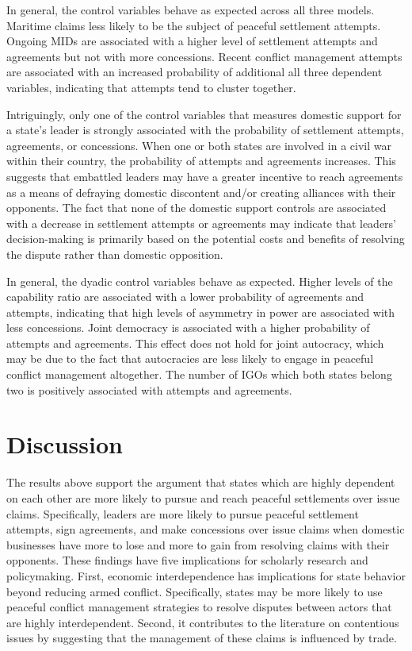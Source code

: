 In general, the control variables behave as expected across all three models. Maritime claims less likely to be the subject of peaceful settlement attempts. Ongoing MIDs are associated with a higher level of settlement attempts and agreements but not with more concessions. Recent conflict management attempts are associated with an increased probability of additional all three dependent variables, indicating that attempts tend to cluster together. 

Intriguingly, only one of the control variables that measures domestic support for a state’s leader is strongly associated with the probability of settlement attempts, agreements, or concessions. When one or both states are involved in a civil war within their country, the probability of attempts and agreements increases. This suggests that embattled leaders may have a greater incentive to reach agreements as a means of defraying domestic discontent and/or creating alliances with their opponents. The fact that none of the domestic support controls are associated with a decrease in settlement attempts or agreements may indicate that leaders’ decision-making is primarily based on the potential costs and benefits of resolving the dispute rather than domestic opposition.

In general, the dyadic control variables behave as expected. Higher levels of the capability ratio are associated with a lower probability of agreements and attempts, indicating that high levels of asymmetry in power are associated with less concessions. Joint democracy is associated with a higher probability of attempts and agreements. This effect does not hold for joint autocracy, which may be due to the fact that autocracies are less likely to engage in peaceful conflict management altogether. The number of IGOs which both states belong two is positively associated with attempts and agreements.

\section{Discussion}

The results above support the argument that states which are highly dependent on each other are more likely to pursue and reach peaceful settlements over issue claims. Specifically, leaders are more likely to pursue peaceful settlement attempts, sign agreements, and make concessions over issue claims when domestic businesses have more to lose and more to gain from resolving claims with their opponents. These findings have five implications for scholarly research and policymaking. First, economic interdependence has implications for state behavior beyond reducing armed conflict. Specifically, states may be more likely to use peaceful conflict management strategies to resolve disputes between actors that are highly interdependent. Second, it contributes to the literature on contentious issues by suggesting that the management of these claims is influenced by trade. 

